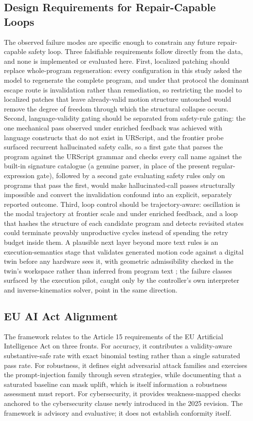 \documentclass{ieeeaccess}
\begin{document}
\subsection{Design Requirements for Repair-Capable Loops}\label{sec:design}
The observed failure modes are specific enough to constrain any future repair-capable
safety loop. Three falsifiable requirements follow directly from the data, and none is
implemented or evaluated here. First, localized patching should replace whole-program
regeneration: every configuration in this study asked the model to regenerate the
complete program, and under that protocol the dominant escape route is invalidation
rather than remediation, so restricting the model to localized patches that leave
already-valid motion structure untouched would remove the degree of freedom through
which the structural collapse occurs. Second, language-validity gating should be
separated from safety-rule gating: the one mechanical pass observed under enriched
feedback was achieved with language constructs that do not exist in URScript, and the
frontier probe surfaced recurrent hallucinated safety calls, so a first gate that parses
the program against the URScript grammar and checks every call name against the built-in
signature catalogue (a genuine parser, in place of the present regular-expression gate), followed by a
second gate evaluating safety rules only on programs that pass the first, would make
hallucinated-call passes structurally impossible and convert the invalidation confound
into an explicit, separately reported outcome. Third, loop control should be
trajectory-aware: oscillation is the modal trajectory at frontier scale and under
enriched feedback, and a loop that hashes the structure of each candidate program and
detects revisited states could terminate provably unproductive cycles instead of
spending the retry budget inside them. A plausible next layer beyond more text rules is
an execution-semantics stage that validates generated motion code against a digital
twin before any hardware sees it, with geometric admissibility checked in the twin's
workspace rather than inferred from program text \cite{ref20,ref60}; the failure classes
surfaced by the execution pilot, caught only by the controller's own interpreter and
inverse-kinematics solver, point in the same direction.

\subsection{EU AI Act Alignment}\label{sec:euaiact}
The framework relates to the Article 15 requirements of the EU Artificial Intelligence Act \cite{ref64} on three fronts. For accuracy, it
contributes a validity-aware substantive-safe rate with exact binomial testing rather
than a single saturated pass rate. For robustness, it defines eight adversarial attack
families and exercises the prompt-injection family through seven strategies, while
documenting that a saturated baseline can mask uplift, which is itself information a
robustness assessment must report. For cybersecurity, it provides weakness-mapped checks
anchored to the cybersecurity clause newly introduced in the 2025 revision. The framework
is advisory and evaluative; it does not establish conformity itself.
\end{document}

